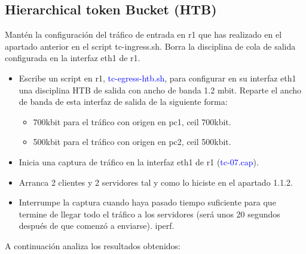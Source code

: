 \documentclass[12pt, a4paper]{report}
\begin{document}
\subsection{Hierarchical token Bucket (HTB)}
Mantén la configuración del tráfico de entrada en r1 que has realizado en el apartado anterior en
el script tc-ingress.sh. Borra la disciplina de cola de salida configurada en la interfaz eth1 de r1.
\begin{itemize}
	\item Escribe un script en r1, \textcolor{blue}{tc-egress-htb.sh}, para configurar en su interfaz eth1 una disciplina
	HTB de salida con ancho de banda 1.2 mbit. Reparte el ancho de banda de esta interfaz de
	salida de la siguiente forma:
	\begin{itemize}
		\item 700kbit para el tráfico con origen en pc1, ceil 700kbit.
		\item 500kbit para el tráfico con origen en pc2, ceil 500kbit.
	\end{itemize}
	\item Inicia una captura de tráfico en la interfaz eth1 de r1 (\textcolor{blue}{tc-07.cap}).
	\item Arranca 2 clientes y 2 servidores tal y como lo hiciste en el apartado 1.1.2.
	\item Interrumpe la captura cuando haya pasado tiempo suficiente para que termine de llegar todo el
	tráfico a los servidores (será unos 20 segundos después de que comenzó a enviarse). iperf.
\end{itemize}
A continuación analiza los resultados obtenidos:
\end{document}
